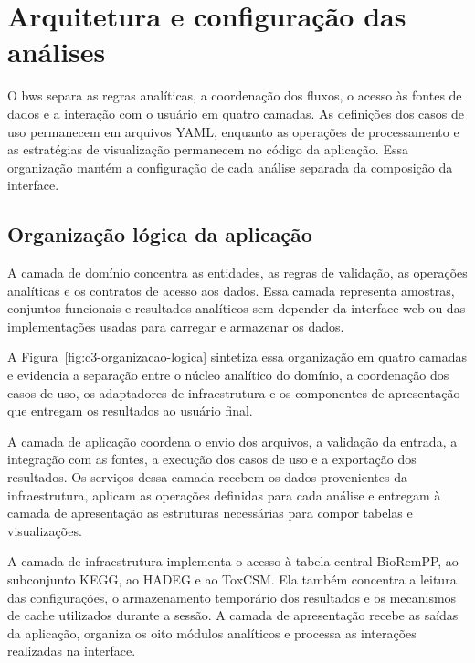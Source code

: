 \section{Arquitetura e configuração das análises}
\label{sec:c3-arquitetura}

O \gls{bws} separa as regras analíticas, a coordenação dos fluxos, o acesso às
fontes de dados e a interação com o usuário em quatro camadas. As definições
dos casos de uso permanecem em arquivos YAML, enquanto as operações de
processamento e as estratégias de visualização permanecem no código da
aplicação. Essa organização mantém a configuração de cada análise separada da
composição da interface.

\subsection{Organização lógica da aplicação}

A camada de domínio concentra as entidades, as regras de validação, as
operações analíticas e os contratos de acesso aos dados. Essa camada representa
amostras, conjuntos funcionais e resultados analíticos sem depender da
interface web ou das implementações usadas para carregar e armazenar os dados.

A Figura~\ref{fig:c3-organizacao-logica} sintetiza essa organização em quatro
camadas e evidencia a separação entre o núcleo analítico do domínio, a
coordenação dos casos de uso, os adaptadores de infraestrutura e os
componentes de apresentação que entregam os resultados ao usuário final.

A camada de aplicação coordena o envio dos arquivos, a validação da entrada, a
integração com as fontes, a execução dos casos de uso e a exportação dos
resultados. Os serviços dessa camada recebem os dados provenientes da
infraestrutura, aplicam as operações definidas para cada análise e entregam à
camada de apresentação as estruturas necessárias para compor tabelas e
visualizações.

A camada de infraestrutura implementa o acesso à tabela central BioRemPP, ao
subconjunto KEGG, ao HADEG e ao ToxCSM. Ela também concentra a leitura das
configurações, o armazenamento temporário dos resultados e os mecanismos de
cache utilizados durante a sessão. A camada de apresentação recebe as saídas
da aplicação, organiza os oito módulos analíticos e processa as interações
realizadas na interface.

